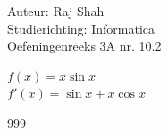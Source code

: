 \documentclass[a4paper]{article}
\begin{document}
  
\noindent \large Auteur: Raj Shah \\
\noindent \large Studierichting: Informatica\\
\noindent \large Oefeningenreeks 3A nr. 10.2 \\

\medskip

\normalsize

$f(x) = x \sin x$\\

$f'(x) = \sin x + x \cos x$

\begin{thebibliography}{999}
\end{thebibliography}
\end{document}
